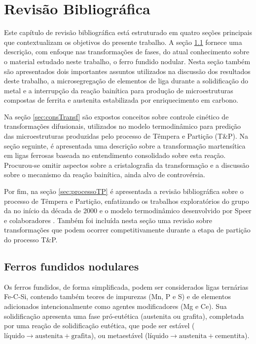 \chapter{Revisão Bibliográfica}

Este capítulo de revisão bibliográfica está estruturado em quatro seções principais que contextualizam os objetivos do presente trabalho. A seção \ref{sec:Fofos} fornece uma descrição, com enfoque nas transformações de fases, do atual conhecimento sobre o material estudado neste trabalho, o ferro fundido nodular. Nesta seção também são apresentados dois importantes assuntos utilizados na discussão dos resultados deste trabalho, a microsegregação de elementos de liga durante a solidificação do metal e a interrupção da reação bainítica para produção de microestruturas compostas de ferrita e austenita estabilizada por enriquecimento em carbono.

Na seção \ref{sec:consTransf} são expostos conceitos sobre controle cinético de transformações difusionais, utilizados no modelo termodinâmico para predição das microestruturas produzidas pelo processo de Têmpera e Partição (T\&P). Na seção seguinte, é apresentada uma descrição sobre a transformação martensítica em ligas ferrosas baseada no entendimento consolidado sobre esta reação. Procurou-se omitir aspectos sobre a cristalografia da transformação e a discussão sobre o mecanismo da reação bainítica, ainda alvo de controvérsia.

Por fim, na seção \ref{sec:processoTP} é apresentada a revisão bibliográfica sobre o processo de Têmpera e Partição, enfatizando os trabalhos exploratórios do grupo da  no início da década de 2000 e o modelo termodinâmico desenvolvido por Speer e colaboradores \cite{Speer2003}. Também foi incluída nesta seção uma revisão sobre transformações que podem ocorrer competitivamente durante a etapa de partição do processo T\&P.

\section{Ferros fundidos nodulares}

\label{sec:Fofos}

Os ferros fundidos, de forma simplificada, podem ser considerados ligas ternárias Fe-C-Si, contendo também teores de impurezas (Mn, P e S) e de elementos adicionados intencionalmente como agentes modificadores (Mg e Ce). Sua solidificação apresenta uma fase pró-eutética (austenita ou grafita), completada por uma reação de solidificação eutética, que pode ser estável ($\text{líquido} \rightarrow \text{austenita} + \text{grafita}$), ou metaestável ($\text{líquido} \rightarrow \text{austenita} + \text{cementita}$).

